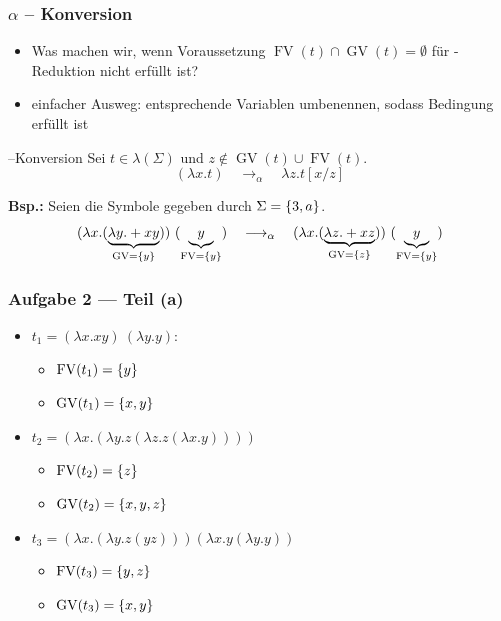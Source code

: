 \documentclass{beamer}
\DeclareMathOperator{\GV}{GV}
\DeclareMathOperator{\FV}{FV}
\begin{document}
\begin{frame} \frametitle{$\alpha$ -- Konversion }
	\footnotesize
	\begin{itemize}
		\item Was machen wir, wenn Voraussetzung $\FV(t) \cap \GV(t) = \emptyset$ für \textbeta-Reduktion nicht erfüllt ist?
		\item einfacher Ausweg: entsprechende Variablen umbenennen, sodass Bedingung erfüllt ist
	\end{itemize}

	\pause
	
	\begin{block}{\textalpha --Konversion}
		Sei $t \in \lambda(\Sigma)$ und $z \notin \GV(t) \cup \FV(t)$.
		\begin{equation*}
			(\lambda x . t) \quad \longrightarrow_\alpha \quad \lambda z . t[x / z]
		\end{equation*}
	\end{block}

	\pause
	
	\textbf{Bsp.:} Seien die Symbole gegeben durch $\Sigma = \left\{ 3,a \right\}$.
	\begin{equation*}
		(\lambda x . (\underbrace{\lambda y . + x y}_{\GV = \menge{y}})) \ (\underbrace{y}_{\FV = \menge{y}}) 
		\quad \longrightarrow_\alpha \quad 
		(\lambda x . (\underbrace{\lambda z . + x z}_{\GV = \menge{z}})) \ (\underbrace{y}_{\FV = \menge{y}})
	\end{equation*}
\end{frame}

\begin{frame} \frametitle{Aufgabe 2 --- Teil (a)}
	\begin{itemize}[<+->]
		\item $t_1 = (\lambda x . x y) \ (\lambda y . y)$:
			\begin{itemize}
				\item $\FV(t_1) = \menge{y}$
				 \item $\GV(t_1) = \menge{x,y}$
			\end{itemize}
		\item $t_2 = (\lambda x . (\lambda y . z (\lambda z . z (\lambda x . y))))$
			\begin{itemize}
				\item $\FV(t_2) = \menge{z}$
				\item $\GV(t_2) = \menge{x,y,z}$
			\end{itemize}
		\item $t_3 = (\lambda x . (\lambda y . z (yz)))(\lambda x . y (\lambda y. y ))$
			\begin{itemize}
				\item $\FV(t_3) = \menge{y,z}$
				\item $\GV(t_3) = \menge{x,y}$
			\end{itemize}
	\end{itemize}
\end{frame}
\end{document}
